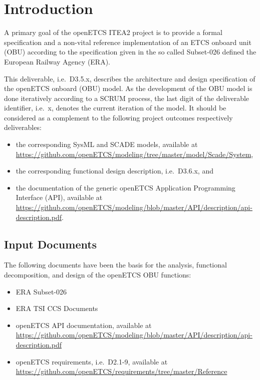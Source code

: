
\chapter{Introduction}

A primary goal of the openETCS ITEA2 project is to provide a formal specification and a non-vital reference implementation of an ETCS onboard unit (OBU) according to the specification given in the so called Subset-026 \cite{subset-026} defined the European Railway Agency (ERA). 

This deliverable, i.e.~D3.5.x, describes the architecture and design specification of the openETCS onboard (OBU) model. As the development of the OBU model is done iteratively according to a SCRUM process, the last digit of the deliverable identifier, i.e.~x, denotes the current iteration of the model. It should be considered as a complement to the following project outcomes respectively deliverables:
\begin{itemize}
\item the corresponding SysML and SCADE models, available at \url{https://github.com/openETCS/modeling/tree/master/model/Scade/System},
\item the corresponding functional design description, i.e.~D3.6.x, and
\item the documentation of the generic openETCS Application Programming Interface (API), available at \url{https://github.com/openETCS/modeling/blob/master/API/description/api-description.pdf}.
\end{itemize}


\section{Input Documents}

The following documents have been the basis for the analysis, functional decomposition, and design of the openETCS OBU functions:
\begin{itemize}
\item ERA Subset-026 \cite{subset-026}
\item ERA TSI CCS Documents
\item openETCS API documentation, available at \url{https://github.com/openETCS/modeling/blob/master/API/description/api-description.pdf}
\item openETCS requirements, i.e.~D2.1-9, available at \url{https://github.com/openETCS/requirements/tree/master/Reference}
\end{itemize}



